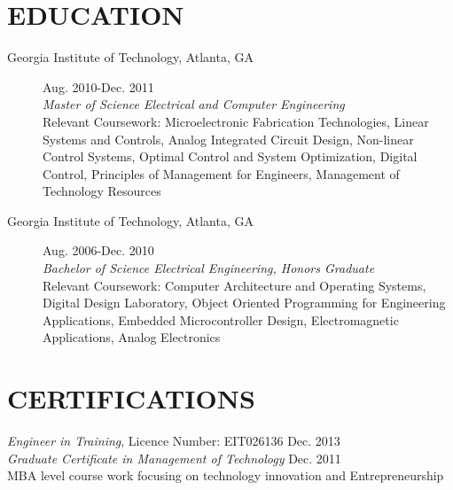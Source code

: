 \documentclass{res}
\begin{document}
\begin{resume}
  \section{EDUCATION}
  	\begin{description}
  		\item[{Georgia Institute of Technology}, Atlanta, GA]\hfill Aug. 2010-Dec. 2011\\\textit{Master of Science Electrical and Computer Engineering}\\Relevant Coursework: Microelectronic Fabrication Technologies, Linear Systems and Controls, Analog Integrated Circuit Design, Non-linear Control Systems, Optimal Control and System Optimization, Digital Control, Principles of Management for Engineers, Management of Technology Resources
  		\item[{Georgia Institute of Technology}, Atlanta, GA]\hfill Aug. 2006-Dec. 2010\\\textit{Bachelor of Science Electrical Engineering, Honors Graduate}\\Relevant Coursework: Computer Architecture and Operating Systems, Digital Design Laboratory, Object Oriented Programming for Engineering Applications, Embedded Microcontroller Design, Electromagnetic Applications, Analog Electronics
  		
  	\end{description}
  
 \section{CERTIFICATIONS}          
 	\emph{Engineer in Training},  Licence Number:  EIT026136 \hfill Dec. 2013 \\
 	\emph{Graduate Certificate in Management of Technology} \hfill Dec. 2011 \\
 	MBA level course work focusing on technology innovation and Entrepreneurship
 	     

\end{resume}
\end{document}
